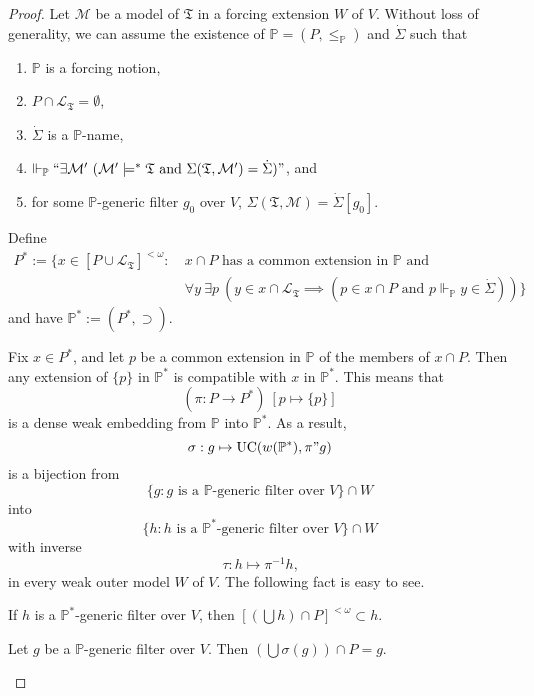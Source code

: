 \documentclass[12pt]{article}
\numberwithin{equation}{section}
\begin{document}
\begin{proof}
Let $\mathcal{M}$ be a model of $\mathfrak{T}$ in a forcing extension $W$ of $V$. Without loss of generality, we can assume the existence of $\mathbb{P} = (P, \leq_{\mathbb{P}})$ and $\dot{\Sigma}$ such that
\begin{enumerate}[label=(\alph*)]
    \item $\mathbb{P}$ is a forcing notion,
    \item $P \cap \mathcal{L}_{\mathfrak{T}} = \emptyset$,
    \item $\dot{\Sigma}$ is a $\mathbb{P}$-name, 
    \item $\Vdash_{\mathbb{P}} ``\exists \mathcal{M}' \ (\mathcal{M}' \models^* \mathfrak{T} \text{ and } \Sigma(\mathfrak{T}, \mathcal{M}') = \dot{\Sigma})"$, and
    \item for some $\mathbb{P}$-generic filter $g_0$ over $V$, $\Sigma(\mathfrak{T}, \mathcal{M}) = \dot{\Sigma}[g_0]$.
\end{enumerate}
Define
\begin{align*}
    P^* := \{x \in [P \cup \mathcal{L}_{\mathfrak{T}}]^{< \omega} : \ & x \cap P \text{ has a common extension in } \mathbb{P} \text{ and} \\ 
    & \forall y \ \exists p \ (y \in x \cap \mathcal{L}_{\mathfrak{T}} \implies (p \in x \cap P \text{ and } p \Vdash_{\mathbb{P}} y \in \dot{\Sigma}))\}
\end{align*}
and have $\mathbb{P}^* := (P^*, \supset)$.

Fix $x \in P^*$, and let $p$ be a common extension in $\mathbb{P}$ of the members of $x \cap P$. Then any extension of $\{p\}$ in $\mathbb{P}^*$ is compatible with $x$ in $\mathbb{P}^*$. This means that $$(\pi : P \longrightarrow P^*) \ [p \mapsto \{p\}]$$ is a dense weak embedding from $\mathbb{P}$ into $\mathbb{P}^*$. As a result, $$\sigma : g \mapsto \mathrm{UC}(w(\mathbb{P}^*), \pi" g)$$ is a bijection from $$\{g : g \text{ is a } \mathbb{P} \text{-generic filter over } V\} \cap W$$ into $$\{h : h \text{ is a } \mathbb{P}^* \text{-generic filter over } V\} \cap W$$ with inverse $$\tau : h \mapsto \pi^{-1} h \text{,}$$ in every weak outer model $W$ of $V$. The following fact is easy to see.

\begin{fact}\label{cufs}
If $h$ is a $\mathbb{P}^*$-generic filter over $V$, then $[(\bigcup h) \cap P]^{< \omega} \subset h$.
\end{fact}

\begin{prop}\label{p524}
Let $g$ be a $\mathbb{P}$-generic filter over $V$. Then $(\bigcup \sigma(g)) \cap P = g$.
\end{prop}


\end{proof}
\end{document}
